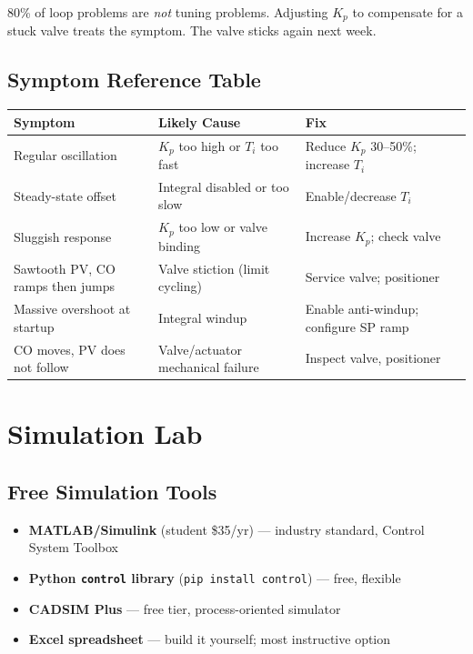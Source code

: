 \documentclass[12pt,twoside,openright]{memoir}
\begin{document}
\begin{commonmistakes}
80\% of loop problems are \emph{not} tuning problems. Adjusting $K_p$ to compensate for a stuck valve treats the symptom. The valve sticks again next week.
\end{commonmistakes}

\section{Symptom Reference Table}

\begin{center}
\begin{tabular}{@{}L{3.5cm}L{4.5cm}L{5cm}@{}}
\toprule
{}
\textbf{Symptom} & \textbf{Likely Cause} & \textbf{Fix} \\
\midrule
Regular oscillation & $K_p$ too high or $T_i$ too fast & Reduce $K_p$ 30--50\%; increase $T_i$ \\
Steady-state offset & Integral disabled or too slow & Enable/decrease $T_i$ \\
Sluggish response & $K_p$ too low or valve binding & Increase $K_p$; check valve \\
Sawtooth PV, CO ramps then jumps & Valve stiction (limit cycling) & Service valve; positioner \\
Massive overshoot at startup & Integral windup & Enable anti-windup; configure SP ramp \\
CO moves, PV does not follow & Valve/actuator mechanical failure & Inspect valve, positioner \\
\bottomrule
\end{tabular}
\end{center}

\chapter{Simulation Lab}

\section{Free Simulation Tools}

\begin{itemize}
  \item \textbf{MATLAB/Simulink} (student \$35/yr) --- industry standard, Control System Toolbox
  \item \textbf{Python \texttt{control} library} (\texttt{pip install control}) --- free, flexible
  \item \textbf{CADSIM Plus} --- free tier, process-oriented simulator
  \item \textbf{Excel spreadsheet} --- build it yourself; most instructive option
\end{itemize}
\end{document}
